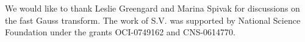We would like to thank Leslie Greengard and Marina Spivak for discussions on the fast Gauss transform. 
The work of S.V. was supported by National Science Foundation under the grants OCI-0749162 and CNS-0614770.